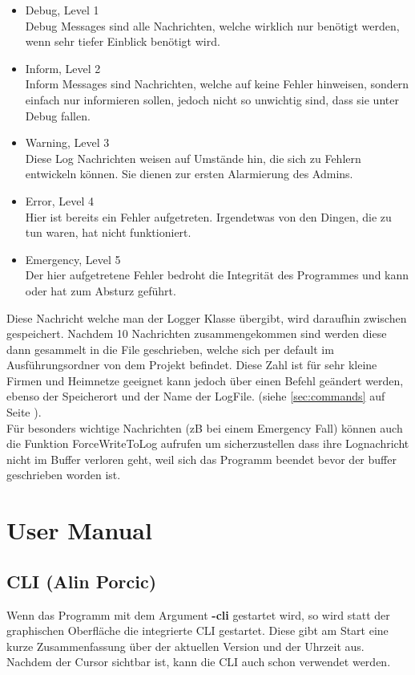 \documentclass[12pt,a4paper]{report}
\begin{document}
\begin{onehalfspace}
\begin{itemize}
\item Debug, Level 1\\
Debug Messages sind alle Nachrichten, welche wirklich nur benötigt werden, wenn sehr tiefer Einblick benötigt wird. 
\item Inform, Level 2\\
Inform Messages sind Nachrichten, welche auf keine Fehler hinweisen, sondern einfach nur informieren sollen, jedoch nicht so unwichtig sind, dass sie unter Debug fallen.
\item Warning, Level 3\\
Diese Log Nachrichten weisen auf Umstände hin, die sich zu Fehlern entwickeln können. Sie dienen zur ersten Alarmierung des Admins.
\item Error, Level 4\\
Hier ist bereits ein Fehler aufgetreten. Irgendetwas von den Dingen, die zu tun waren, hat nicht funktioniert. 
\item Emergency, Level 5\\
Der hier aufgetretene Fehler bedroht die Integrität des Programmes und kann oder hat zum Absturz geführt. 
\end{itemize}
Diese Nachricht welche man der Logger Klasse übergibt, wird daraufhin zwischen gespeichert. Nachdem 10 Nachrichten zusammengekommen sind werden diese dann gesammelt in die File geschrieben, welche sich per default im Ausführungsordner von dem Projekt befindet. Diese Zahl ist für sehr kleine Firmen und Heimnetze geeignet kann jedoch über einen Befehl geändert werden, ebenso der Speicherort und der Name der LogFile. (siehe \ref{sec:commands} auf Seite \pageref{sec:commands}).\\
Für besonders wichtige Nachrichten (zB bei einem Emergency Fall) können auch die Funktion ForceWriteToLog aufrufen um sicherzustellen dass ihre Lognachricht nicht im Buffer verloren geht, weil sich das Programm beendet bevor der buffer geschrieben worden ist.\\

\part{User Manual}
\chapter{CLI (Alin Porcic)} \label{chap:CLI_UM}

Wenn das Programm mit dem Argument \textbf{-cli} gestartet wird, so wird statt der graphischen Oberfläche die integrierte CLI gestartet. Diese gibt am Start eine kurze Zusammenfassung über der aktuellen Version und der Uhrzeit aus. Nachdem der Cursor sichtbar ist, kann die CLI auch schon verwendet werden.


\end{onehalfspace}
\end{document}
